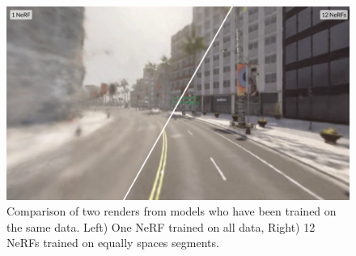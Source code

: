 \begin{figure}[!h]
    \centering
    \includegraphics[width=1.0\textwidth]{figures/block-nerf-comparison.png}
    \caption{Comparison of two renders from models who have been trained on the same data. Left) One NeRF trained on all data, Right) 12 NeRFs trained on equally spaces segments.}
    \label{fig:block-nerf-comparison}
\end{figure}